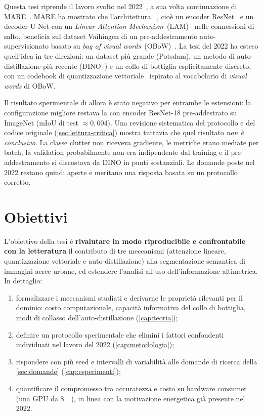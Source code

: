 Questa tesi riprende il lavoro svolto nel 2022~\cite{campana2022tesi}, a sua volta continuazione
di MARE~\cite{marsocci2021mare}. MARE ha mostrato che l'architettura
\maresunet{}~\cite{li2022maresunet}, cioè un encoder ResNet~\cite{he2016resnet} e un decoder
U-Net con un \emph{Linear Attention Mechanism}~(LAM)~\cite{li2020lam} nelle connessioni di
salto, beneficia sul dataset Vaihingen di un pre-addestramento auto-supervisionato basato su
\emph{bag of visual words}~(OBoW)~\cite{gidaris2021obow}. La tesi del 2022 ha esteso
quell'idea in tre direzioni: un dataset più grande (Potsdam), un metodo di auto-distillazione
più recente (DINO~\cite{caron2021dino}) e un collo di bottiglia esplicitamente discreto, con un
codebook di quantizzazione vettoriale~\cite{vandenoord2017vqvae} ispirato al vocabolario di
\emph{visual words} di OBoW.

Il risultato sperimentale di allora è stato negativo per entrambe le estensioni: la
configurazione migliore restava la \maresunet{} con encoder ResNet-18 pre-addestrato su
ImageNet (mIoU di test $\approx 0{,}604$). Una revisione sistematica del protocollo e del codice
originale (\cref{sec:lettura-critica}) mostra tuttavia che quel risultato \emph{non è
conclusivo}. La classe clutter non riceveva gradiente, le metriche erano mediate per batch, la
validation probabilmente non era indipendente dal training e il pre-addestramento si
discostava da DINO in punti sostanziali. Le domande poste nel 2022 restano quindi aperte e
meritano una risposta basata su un protocollo corretto.

\section{Obiettivi}
\label{sec:obiettivi}

L'obiettivo della tesi è \textbf{rivalutare in modo riproducibile e confrontabile con la
letteratura} il contributo di tre meccanismi (attenzione lineare, quantizzazione vettoriale e
auto-distillazione) alla segmentazione semantica di immagini aeree urbane, ed estendere
l'analisi all'uso dell'informazione altimetrica. In dettaglio:

\begin{enumerate}
  \item formalizzare i meccanismi studiati e derivarne le proprietà rilevanti per il dominio:
  costo computazionale, capacità informativa del collo di bottiglia, modi di collasso
  dell'auto-distillazione (\cref{cap:teoria});
  \item definire un protocollo sperimentale che elimini i fattori confondenti individuati nel
  lavoro del 2022 (\cref{cap:metodologia});
  \item rispondere con più seed e intervalli di variabilità alle domande di ricerca della
  \cref{sec:domande} (\cref{cap:esperimenti});
  \item quantificare il compromesso tra accuratezza e costo su hardware consumer (una GPU da
  \SI{8}{\giga\byte}), in linea con la motivazione energetica già presente nel 2022.
\end{enumerate}

